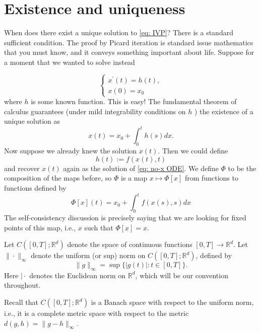 \chapter{Existence and uniqueness}
When does there exist a unique solution to \eqref{eq: IVP}? There is a standard sufficient condition. The proof by Picard iteration is standard issue mathematics that you must know, and it conveys something important about life.
Suppose for a moment that we wanted to solve instead

\begin{equation}
    \label{eq: no-x ODE}
    \left\{\begin{array}{l}
        x^{\prime}(t)=h(t), \\
        x(0)=x_{0}
        \end{array}\right. 
\end{equation}
where $h$ is some known function. This is easy! The fundamental theorem of calculus guarantees (under mild integrability conditions on $h$ ) the existence of a unique solution as
$$
x(t)=x_{0}+\int_{0}^{t} h(s) d x .
$$
Now suppose we already knew the solution $x(t)$. Then we could define
$$
h(t):=f(x(t), t)
$$
and recover $x(t)$ again as the solution of \eqref{eq: no-x ODE}. We define  $\Phi$ to be the composition of the maps before, so $\Phi$ is a map $x \mapsto \Phi[x]$ from functions to functions defined by
$$
\Phi[x](t)=x_{0}+\int_{0}^{t} f(x(s), s) d x
$$
The self-consistency discussion is precisely saying that we are looking for fixed points of this map, i.e., $x$ such that $\Phi[x]=x$.


\begin{definition}
\label{def: Function space}
Let $C\left([0, T] ; \mathbb{R}^{d}\right)$ denote the space of continuous functions $[0, T] \rightarrow \mathbb{R}^{d}$. Let $\|\cdot\|_{\infty}$ denote the uniform (or sup) norm on $C\left([0, T] ; \mathbb{R}^{d}\right)$, defined by
$$
\|g\|_{\infty}=\sup \{|g(t)|: t \in[0, T]\} .
$$
Here $\mid \cdot$ denotes the Euclidean norm on $\mathbb{R}^{d}$, which will be our convention throughout.
\end{definition}


\begin{remark}
    Recall that $C\left([0, T] ; \mathbb{R}^{d}\right)$ is a Banach space with respect to the uniform norm, i.e., it is a complete metric space with respect to the metric $d(g, h)=\|g-h\|_{\infty}$.
\end{remark}

